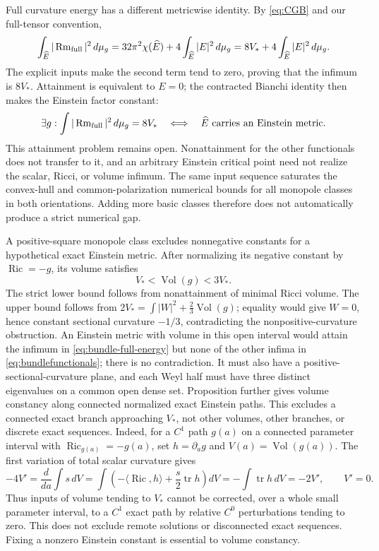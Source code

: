 \documentclass[a4paper,11pt]{article}
\numberwithin{equation}{section}
\theoremstyle{definition}
\newcommand{\Ric}{\operatorname{Ric}}
\newcommand{\Rm}{\operatorname{Rm}}
\newcommand{\Vol}{\operatorname{Vol}}
\newcommand{\tr}{\operatorname{tr}}
\newcommand{\dd}{\,d\mu_g}
\begin{document}
Full curvature energy has a different metricwise identity. By \eqref{eq:CGB} and our full-tensor convention,
\begin{equation}\label{eq:bundle-full-energy}
 \int_{\widehat E}|\Rm_{\rm full}|^2\dd
 =32\pi^2\chi(\widehat E)+4\int_{\widehat E}|E|^2\dd
 =8V_*+4\int_{\widehat E}|E|^2\dd .
\end{equation}
The explicit inputs make the second term tend to zero, proving that the infimum is $8V_*$.
Attainment is equivalent to $E=0$; the contracted Bianchi identity then makes the Einstein factor constant:
\begin{equation}\label{eq:bundle-attainment-equivalence}
 \exists g:\int|\Rm_{\rm full}|^2\dd=8V_*
 \quad\Longleftrightarrow\quad
 \widehat E\text{ carries an Einstein metric}.
\end{equation}
This attainment problem remains open. Nonattainment for the other functionals does not transfer to it, and an arbitrary Einstein critical point need not realize the scalar, Ricci, or volume infimum.
The same input sequence saturates the convex-hull and common-polarization numerical bounds for all monopole classes in both orientations. Adding more basic classes therefore does not automatically produce a strict numerical gap.

A positive-square monopole class excludes nonnegative constants for a hypothetical exact Einstein metric.
After normalizing its negative constant by $\Ric=-g$, its volume satisfies
\begin{equation}\label{eq:bundle-einstein-window}
 V_*<\Vol(g)<3V_*.
\end{equation}
The strict lower bound follows from nonattainment of minimal Ricci volume.
The upper bound follows from $2V_*=\int|W|^2+\tfrac23\Vol(g)$; equality would give $W=0$, hence constant sectional curvature $-1/3$, contradicting the nonpositive-curvature obstruction.
An Einstein metric with volume in this open interval would attain the infimum in \eqref{eq:bundle-full-energy} but none of the other infima in \eqref{eq:bundlefunctionals}; there is no contradiction.
It must also have a positive-sectional-curvature plane, and each Weyl half must have three distinct eigenvalues on a common open dense set.
Proposition  further gives volume constancy along connected normalized exact Einstein paths. This excludes a connected exact branch approaching $V_*$, not other volumes, other branches, or discrete exact sequences.
Indeed, for a $C^1$ path $g(a)$ on a connected parameter interval with $\Ric_{g(a)}=-g(a)$, set $h=\partial_ag$ and $V(a)=\Vol(g(a))$. The first variation of total scalar curvature gives
\begin{equation}\label{eq:bundle-exact-path-volume}
 -4V'=\frac d{da}\int s\,dV
 =\int\left(-\langle\Ric,h\rangle+\frac s2\tr h\right)dV
 =-\int\tr h\,dV=-2V',
 \qquad V'=0.
\end{equation}
Thus inputs of volume tending to $V_*$ cannot be corrected, over a whole small parameter interval, to a $C^1$ exact path by relative $C^0$ perturbations tending to zero.
This does not exclude remote solutions or disconnected exact sequences.
Fixing a nonzero Einstein constant is essential to volume constancy.
\end{document}
